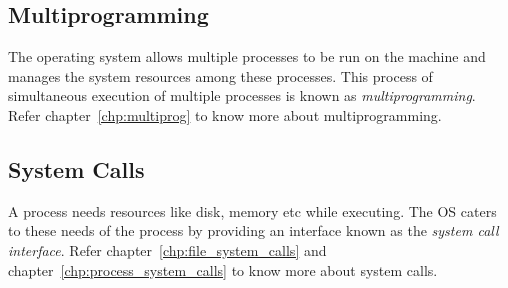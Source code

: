 \subsection{Multiprogramming}
The operating system allows multiple processes to be run on the machine and manages the system resources among these processes. 
This process of simultaneous execution of multiple processes is known as \emph{multiprogramming}. Refer chapter~\ref{chp:multiprog} to know more about multiprogramming.

\subsection{System Calls}
A process needs resources like disk, memory etc while executing. The OS caters to these needs of the process by providing an interface  known as the \emph{system call interface}. Refer chapter~\ref{chp:file_system_calls} and chapter~\ref{chp:process_system_calls} to know more about system calls.

